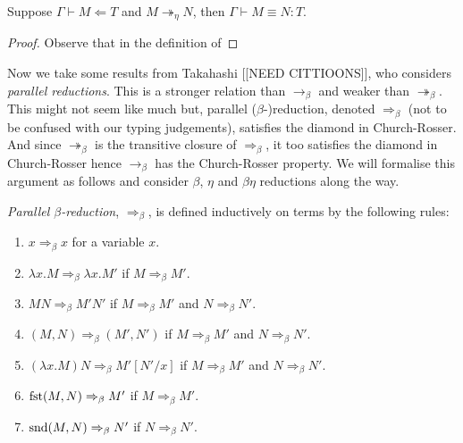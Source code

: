 \begin{comment}
\begin{proof}
    By definition $\partial_{\eta}(r)= \max(\partial(T), \partial(U))+1$ for some types $U$ and $V$ such that $T = U \times V$ or $T = U \to V$. Hence 
\end{proof}


\begin{lemma}
    $\eta$-reduction is weakly normalising.
\end{lemma}

\begin{lemma}
    $\eta$-reduction is strongly normalising.
\end{lemma}
\end{comment}

\begin{lemma}
    Suppose $\Gamma \vdash M \Leftarrow T$ and $M \twoheadrightarrow_{\eta} N$, then $\Gamma \vdash M \equiv N : T$.
\end{lemma}

\begin{proof}
    Observe that in the definition of 
\end{proof}

Now we take some results from Takahashi \cite{} [[NEED CITTIOONS]], who considers \emph{parallel reductions}. This is a stronger relation than $\to_{\beta}$
and weaker than $\twoheadrightarrow_{\beta}$. This might not seem like much but, parallel ($\beta$-)reduction, denoted $\Rightarrow_{\beta}$ (not to be confused with our typing judgements), satisfies the diamond in Church-Rosser. And since $\twoheadrightarrow_{\beta}$ is the transitive closure of $\Rightarrow_{\beta}$, it too satisfies the diamond in Church-Rosser hence $\to_{\beta}$ has the Church-Rosser property. We will formalise this argument as follows and consider $\beta$, $\eta$ and $\beta \eta$ reductions along the way.

\begin{defin}
    \emph{Parallel $\beta$-reduction}, $\Rightarrow_{\beta}$, is defined inductively on terms by the following rules:
    \begin{enumerate}
        \item $x \Rightarrow_{\beta} x$ for a variable $x$.
        \item $\lambda x . M \Rightarrow_{\beta} \lambda x . M'$ if $M \Rightarrow_{\beta} M'$.
        \item $MN \Rightarrow_{\beta} M' N'$ if $M \Rightarrow_{\beta} M'$ and $N \Rightarrow_{\beta} N'$.
        \item $(M, N) \Rightarrow_{\beta} (M', N')$ if $M \Rightarrow_{\beta} M'$ and $N \Rightarrow_{\beta} N'$.
        \item $(\lambda x . M)N \Rightarrow_{\beta} M'[N' / x]$ if $M \Rightarrow_{\beta} M'$ and $N \Rightarrow_{\beta} N'$.
        \item $\mathrm{fst}(M, N) \Rightarrow_{\beta} M'$ if $M \Rightarrow_{\beta} M'$.
        \item $\mathrm{snd}(M, N) \Rightarrow_{\beta} N'$ if $N \Rightarrow_{\beta} N'$.
    \end{enumerate}
\end{defin}


